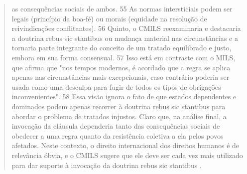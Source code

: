 \documentclass{article}
\begin{document}
\begin{quote}
as consequências sociais de ambos. 55 As normas intersticiais podem ser legais
(princípio da boa-fé) ou morais (equidade na resolução de reivindicações conflitantes). 56
Quinto, o CMILS reexaminaria e destacaria a doutrina rebus sic stantibus
ou mudança material nas circunstâncias e a tornaria parte integrante do
conceito de um tratado equilibrado e justo, embora em sua forma consensual. 57 Isso
está em contraste com o MILS, que afirma que "nos tempos modernos, é acordado
que a regra se aplica apenas nas circunstâncias mais excepcionais, caso contrário
poderia ser usada como uma desculpa para fugir de todos os tipos de obrigações inconvenientes". 58
Essa visão ignora o fato de que estados dependentes e dominados podem
apenas recorrer à doutrina rebus sic stantibus para abordar o problema de
tratados injustos. Claro que, na análise final, a invocação da cláusula
dependeria tanto das consequências sociais de obedecer a uma regra quanto da
resistência coletiva a ela pelos povos afetados. Neste contexto, o direito internacional
dos direitos humanos é de relevância óbvia, e o CMILS sugere que ele
deve ser cada vez mais utilizado para dar suporte à invocação da doutrina rebus
    sic stantibus \cite[p.~66-70, tradução por IA]{chimni_outline_2008}.

\end{quote}

\printbibliography
\end{document}
